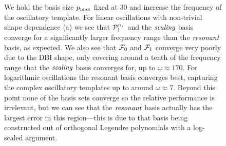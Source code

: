 \begin{figure}[!pth]
\centering
{}\\
\\
\caption{
    We hold the basis size $p_\text{max}$ fixed at $30$ and increase the frequency of
    the oscillatory template.
    For linear oscillations with non-trivial shape dependence (a) we see that
    $\mathcal{P}^{n_s}_1$ and the $\textit{scaling}$ basis converge for a significantly larger
    frequency range than the $\textit{resonant}$ basis, as expected.
    We also see that $\mathcal{F}_0$ and $\mathcal{F}_1$ converge very poorly due to the
    DBI shape, only covering around a tenth of the frequency range that
    the $\textit{scaling}$ basis converges for, up to $\omega\approx170$.
    For logarithmic oscillations the resonant basis converges best,
    capturing the complex oscillatory templates up to around $\omega\approx7$.
    Beyond this point none of the basis sets converge so the relative
    performance is irrelevant, but we can see that the $\textit{resonant}$ basis
    actually has the largest error in this region---this is due to that basis
    being constructed out of orthogonal Legendre polynomials with
    a log-scaled argument.
    }\label{fig:plot_freq_scan_dbi}
\end{figure}

